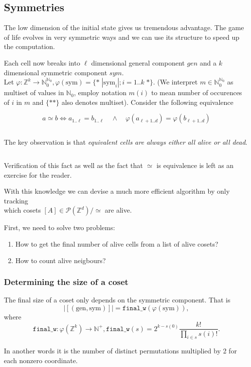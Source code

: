 \documentclass[]{article}
\newcommand{\NN}{\mathbb N}
\newcommand{\ZZ}{\mathbb Z}
\newcommand{\calP}{\mathcal P}
\newcommand{\finalw}{\texttt{final\_w}}
\newcommand{\sym}{\mathrm{sym}}
\newcommand{\gen}{\mathrm{gen}}
\begin{document}
	\subsection{Symmetries}
	
	The low dimension of the initial state gives us tremendous advantage. The game of life evolves in very symmetric ways and we can use its structure to speed up the computation.
	
	Each cell now breaks into $\ell$ dimensional general component $gen$ and a $k$ dimensional symmetric component $sym$.\\
	Let $\varphi: \ZZ^k \to \NN_0^{\NN_0}, \varphi(\sym) = \{*\;|\sym_i|; i = 1..k\; *\}$. (We interpret $m \in \NN_0^{\NN_0}$ as multiset of values in $\NN_0$, employ notation $m(i)$ to mean number of occurences of $i$ in $m$ and $\{**\}$ also denotes multiset).
	Consider the following equivalence
	
	
	$$a \simeq b \iff a_{1..\ell} = b_{1..\ell} \quad\land\quad \varphi(a_{\ell+1..d}) = \varphi(b_{\ell+1..d})$$
	
	$ $
	
	The key observation is that \emph{equivalent cells are always either all alive or all dead}.
	
	$ $
	
	Verification of this fact as well as the fact that $\simeq$ is equivalence is left as an exercise for the reader.
	
	With this knowledge we can devise a much more efficient algorithm by only tracking\\which cosets $[A] \in \calP(\ZZ^d) /\simeq$ are alive.
	
	First, we need to solve two problems:
	\begin{enumerate}
		\item How to get the final number of alive cells from a list of alive cosets?
		\item How to count alive neigbours?
	\end{enumerate}

	\subsubsection{Determining the size of a coset}
	The final size of a coset only depends on the symmetric component. That is
	$$|[(\gen,\sym)]| = \finalw(\varphi(\sym)),$$
	where
	$$\finalw: \varphi(\ZZ^k) \to \NN^+, \finalw(s) = 2^{k-s(0)}\frac{k!}{\prod\limits_{i \in s} s(i)!}.$$

	In another words it is the number of distinct permutations multiplied by 2 for each nonzero coordinate.
	
\end{document}
